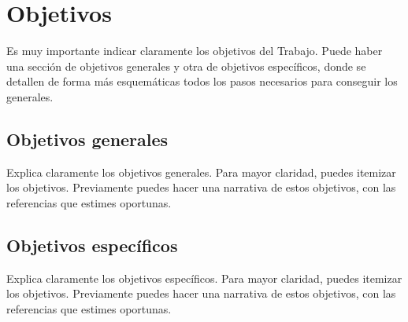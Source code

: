\chapter{Objetivos}
Es muy importante indicar claramente los objetivos del Trabajo. Puede haber una sección de objetivos generales y otra de objetivos específicos, donde se detallen de forma más esquemáticas todos los pasos necesarios para conseguir los generales.
\section{Objetivos generales}
Explica claramente los objetivos generales. Para mayor claridad, puedes itemizar los objetivos. Previamente puedes hacer una narrativa de estos objetivos, con las referencias que estimes oportunas.
\section{Objetivos específicos}
Explica claramente los objetivos específicos. Para mayor claridad, puedes itemizar los objetivos. Previamente puedes hacer una narrativa de estos objetivos, con las referencias que estimes oportunas.